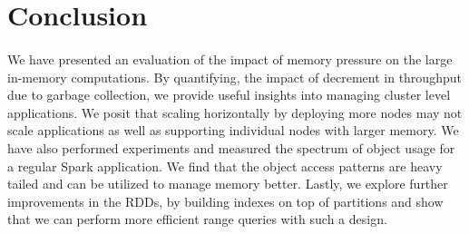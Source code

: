 \section{Conclusion}
\label{sec:conclusion}
\paragraph{}
We have presented an evaluation of the impact of memory pressure on the large in-memory computations. By quantifying, the impact of decrement in throughput due to garbage collection, we provide useful insights into managing cluster level applications. We posit that scaling horizontally by deploying more nodes may not scale applications as well as supporting individual nodes with larger memory. We have also performed experiments and measured the spectrum of object usage for a regular Spark application. We find that the object access patterns are heavy tailed and can be utilized to manage memory better. Lastly, we explore further improvements in the RDDs, by building indexes on top of partitions and show that we can perform more efficient range queries with such a design.
